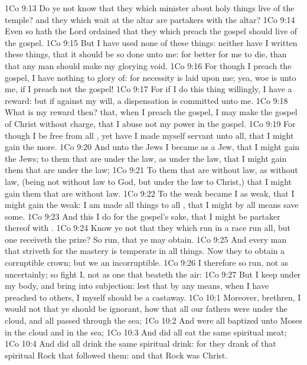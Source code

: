 \vs 1Co 9:13 Do ye not know that they which minister about holy things live  of the temple? and they which wait at the altar are partakers with the altar?
\vs 1Co 9:14 Even so hath the Lord ordained that they which preach the gospel should live of the gospel.
\vs 1Co 9:15 But I have used none of these things: neither have I written these things, that it should be so done unto me: for  better for me to die, than that any man should make my glorying void.
\vs 1Co 9:16 For though I preach the gospel, I have nothing to glory of: for necessity is laid upon me; yea, woe is unto me, if I preach not the gospel!
\vs 1Co 9:17 For if I do this thing willingly, I have a reward: but if against my will, a dispensation  is committed unto me.
\vs 1Co 9:18 What is my reward then?  that, when I preach the gospel, I may make the gospel of Christ without charge, that I abuse not my power in the gospel.
\vs 1Co 9:19 For though I be free from all , yet have I made myself servant unto all, that I might gain the more.
\vs 1Co 9:20 And unto the Jews I became as a Jew, that I might gain the Jews; to them that are under the law, as under the law, that I might gain them that are under the law;
\vs 1Co 9:21 To them that are without law, as without law, (being not without law to God, but under the law to Christ,) that I might gain them that are without law.
\vs 1Co 9:22 To the weak became I as weak, that I might gain the weak: I am made all things to all , that I might by all means save some.
\vs 1Co 9:23 And this I do for the gospel's sake, that I might be partaker thereof with .
\vs 1Co 9:24 Know ye not that they which run in a race run all, but one receiveth the prize? So run, that ye may obtain.
\vs 1Co 9:25 And every man that striveth for the mastery is temperate in all things. Now they  to obtain a corruptible crown; but we an incorruptible.
\vs 1Co 9:26 I therefore so run, not as uncertainly; so fight I, not as one that beateth the air:
\vs 1Co 9:27 But I keep under my body, and bring  into subjection: lest that by any means, when I have preached to others, I myself should be a castaway.
\vs 1Co 10:1 Moreover, brethren, I would not that ye should be ignorant, how that all our fathers were under the cloud, and all passed through the sea;
\vs 1Co 10:2 And were all baptized unto Moses in the cloud and in the sea;
\vs 1Co 10:3 And did all eat the same spiritual meat;
\vs 1Co 10:4 And did all drink the same spiritual drink: for they drank of that spiritual Rock that followed them: and that Rock was Christ.
